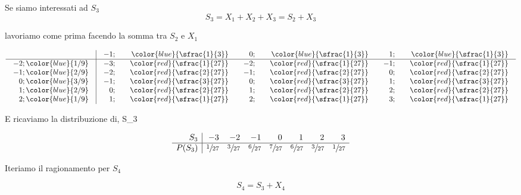 \documentclass[
  11pt,
]{book}
\theoremstyle{mytheoremstyle}
\theoremstyle{mydefstyle}
\begin{document}
Se siamo interessati ad \(S_3\)
\[
S_3=X_1+X_2+X_3=S_2+X_3
\]

lavoriamo come prima facendo la somma tra \(S_2\) e \(X_1\)

\normalsize

\[\arraycolsep=10pt\def\arraystretch{1}\begin{array}{ r|rrrrrr }
& -1 ;&\color{blue}{ \sfrac{ 1 } { 3 }} & 0 ;&\color{blue}{ \sfrac{ 1 } { 3 }} & 1 ;&\color{blue}{ \sfrac{ 1 } { 3 }} \\ 
\hline 
-2 ;\color{blue}{ 1 / 9 }& -3;&\color{red}{\sfrac{1}{27}}& -2;&\color{red}{\sfrac{1}{27}}& -1;&\color{red}{\sfrac{1}{27}}\\ 
-1 ;\color{blue}{ 2 / 9 }& -2;&\color{red}{\sfrac{2}{27}}& -1;&\color{red}{\sfrac{2}{27}}& 0;&\color{red}{\sfrac{2}{27}}\\ 
0 ;\color{blue}{ 3 / 9 }& -1;&\color{red}{\sfrac{3}{27}}& 0;&\color{red}{\sfrac{3}{27}}& 1;&\color{red}{\sfrac{3}{27}}\\ 
1 ;\color{blue}{ 2 / 9 }& 0;&\color{red}{\sfrac{2}{27}}& 1;&\color{red}{\sfrac{2}{27}}& 2;&\color{red}{\sfrac{2}{27}}\\ 
2 ;\color{blue}{ 1 / 9 }& 1;&\color{red}{\sfrac{1}{27}}& 2;&\color{red}{\sfrac{1}{27}}& 3;&\color{red}{\sfrac{1}{27}}\\ 
\end{array}
 \]

\normalsize E ricaviamo la distribuzione di, S\_3

\normalsize

\[
     \begin{array}{ r|rrrrrrr }
 S_3  & -3& -2& -1& 0& 1& 2& 3 \\ 
 \hline 
 P( S_3 ) & \sfrac{1}{27}& \sfrac{3}{27}& \sfrac{6}{27}& \sfrac{7}{27}& \sfrac{6}{27}& \sfrac{3}{27}& \sfrac{1}{27} \\ 
 \end{array}
 \]

Iteriamo il ragionamento per \(S_4\)

\[
S_4=S_3+X_4
\]

\normalsize
\end{document}
